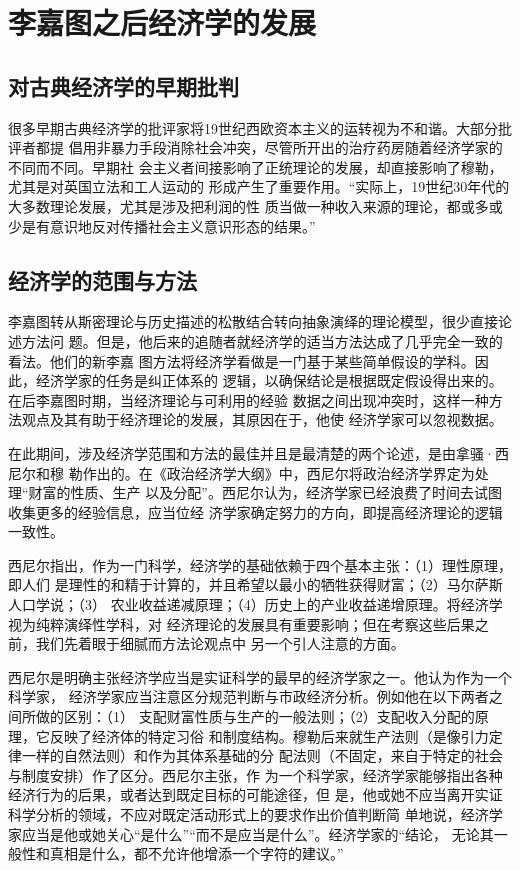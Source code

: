 \section{李嘉图之后经济学的发展}

\subsection{对古典经济学的早期批判}

很多早期古典经济学的批评家将19世纪西欧资本主义的运转视为不和谐。大部分批评者都提
倡用非暴力手段消除社会冲突，尽管所开出的治疗药房随着经济学家的不同而不同。早期社
会主义者间接影响了正统理论的发展，却直接影响了穆勒，尤其是对英国立法和工人运动的
形成产生了重要作用。“实际上，19世纪30年代的大多数理论发展，尤其是涉及把利润的性
质当做一种收入来源的理论，都或多或少是有意识地反对传播社会主义意识形态的结果。”

\subsection{经济学的范围与方法}

李嘉图转从斯密理论与历史描述的松散结合转向抽象演绎的理论模型，很少直接论述方法问
题。但是，他后来的追随者就经济学的适当方法达成了几乎完全一致的看法。他们的新李嘉
图方法将经济学看做是一门基于某些简单假设的学科。因此，经济学家的任务是纠正体系的
逻辑，以确保结论是根据既定假设得出来的。在后李嘉图时期，当经济理论与可利用的经验
数据之间出现冲突时，这样一种方法观点及其有助于经济理论的发展，其原因在于，他使
经济学家可以忽视数据。

在此期间，涉及经济学范围和方法的最佳并且是最清楚的两个论述，是由拿骚·西尼尔和穆
勒作出的。在《政治经济学大纲》中，西尼尔将政治经济学界定为处理“财富的性质、生产
以及分配”。西尼尔认为，经济学家已经浪费了时间去试图收集更多的经验信息，应当位经
济学家确定努力的方向，即提高经济理论的逻辑一致性。

西尼尔指出，作为一门科学，经济学的基础依赖于四个基本主张：（1）理性原理，即人们
是理性的和精于计算的，并且希望以最小的牺牲获得财富；（2）马尔萨斯人口学说；（3）
农业收益递减原理；（4）历史上的产业收益递增原理。将经济学视为纯粹演绎性学科，对
经济理论的发展具有重要影响；但在考察这些后果之前，我们先着眼于细腻而方法论观点中
另一个引人注意的方面。

西尼尔是明确主张经济学应当是实证科学的最早的经济学家之一。他认为作为一个科学家，
经济学家应当注意区分规范判断与市政经济分析。例如他在以下两者之间所做的区别：（1）
支配财富性质与生产的一般法则；（2）支配收入分配的原理，它反映了经济体的特定习俗
和制度结构。穆勒后来就生产法则（是像引力定律一样的自然法则）和作为其体系基础的分
配法则（不固定，来自于特定的社会与制度安排）作了区分。西尼尔主张，作
为一个科学家，经济学家能够指出各种经济行为的后果，或者达到既定目标的可能途径，但
是，他或她不应当离开实证科学分析的领域，不应对既定活动形式上的要求作出价值判断简
单地说，经济学家应当是他或她关心“是什么”“而不是应当是什么”。经济学家的“结论，
无论其一般性和真相是什么，都不允许他增添一个字符的建议。”

